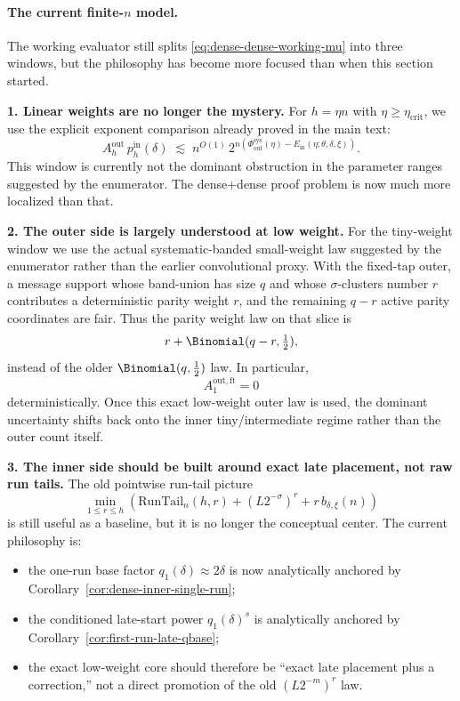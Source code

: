 \paragraph{The current finite-\(n\) model.}
The working evaluator still splits \eqref{eq:dense-dense-working-mu} into three windows, but the philosophy has
become more focused than when this section started.

\medskip
\noindent
\textbf{1. Linear weights are no longer the mystery.}
For \(h=\eta n\) with \(\eta\ge \eta_{\mathrm{crit}}\), we use the explicit exponent comparison already proved in the
main text:
\[
A_h^{\mathrm{out}}\,p_h^{\mathrm{in}}(\delta)
\;\lesssim\;
n^{O(1)}\,2^{n(\Phi_{\mathrm{out}}^{\mathrm{sys}}(\eta)-E_{\mathrm{in}}(\eta;\theta,\delta,\xi))}.
\]
This window is currently not the dominant obstruction in the parameter ranges suggested by the enumerator.
The dense+dense proof problem is now much more localized than that.

\medskip
\noindent
\textbf{2. The outer side is largely understood at low weight.}
For the tiny-weight window we use the actual systematic-banded small-weight law suggested by the enumerator rather than
the earlier convolutional proxy. With the fixed-tap outer, a message support whose band-union has size \(q\) and whose
\(\sigma\)-clusters number \(r\) contributes a deterministic parity weight \(r\), and the remaining \(q-r\) active
parity coordinates are fair. Thus the parity weight law on that slice is
\[
r+\Binomial(q-r,\tfrac12),
\]
instead of the older \(\Binomial(q,\tfrac12)\) law. In particular,
\begin{equation}
\label{eq:dense-dense-working-outer-small}
A_1^{\mathrm{out,ft}}=0
\end{equation}
deterministically. Once this exact low-weight outer law is used, the dominant uncertainty shifts back onto the inner
tiny/intermediate regime rather than the outer count itself.

\medskip
\noindent
\textbf{3. The inner side should be built around exact late placement, not raw run tails.}
The old pointwise run-tail picture
\[
\min_{1\le r\le h}
\left(
\mathrm{RunTail}_n(h,r)+(L2^{-\sigma})^r+r\,b_{\delta,\xi}(n)
\right)
\]
is still useful as a baseline, but it is no longer the conceptual center.
The current philosophy is:
\begin{itemize}
\item the one-run base factor \(q_1(\delta)\approx 2\delta\) is now analytically anchored by
Corollary~\ref{cor:dense-inner-single-run};
\item the conditioned late-start power \(q_1(\delta)^s\) is analytically anchored by
Corollary~\ref{cor:first-run-late-qbase};
\item the exact low-weight core should therefore be ``exact late placement plus a correction,'' not a direct promotion
of the old \((L2^{-m})^r\) law.
\end{itemize}

